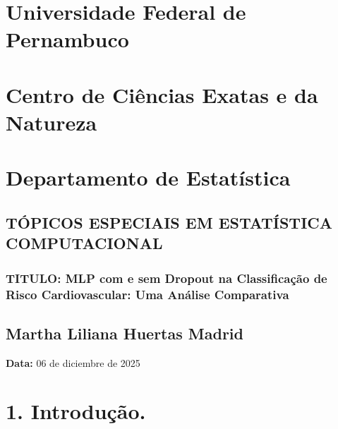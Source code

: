 \documentclass[
  oneclumn]{article}
\author{}
\date{}
\begin{document}
\section{Universidade Federal de
Pernambuco}\label{universidade-federal-de-pernambuco}

\vspace{-.4cm}

\section{Centro de Ciências Exatas e da
Natureza}\label{centro-de-ciuxeancias-exatas-e-da-natureza}

\vspace{-.4cm}

\section{Departamento de
Estatística}\label{departamento-de-estatuxedstica}

\vspace{.5cm}

\subsection{TÓPICOS ESPECIAIS EM ESTATÍSTICA
COMPUTACIONAL}\label{tuxf3picos-especiais-em-estatuxedstica-computacional}

\vspace{.2cm}

\subsubsection{TITULO: MLP com e sem Dropout na Classificação de Risco
Cardiovascular: Uma Análise
Comparativa}\label{titulo-mlp-com-e-sem-dropout-na-classificauxe7uxe3o-de-risco-cardiovascular-uma-anuxe1lise-comparativa}

\vspace{.5cm}

\subsection{Martha Liliana Huertas
Madrid}\label{martha-liliana-huertas-madrid}

\vspace{.5cm}

\textbf{Data:} 06 de diciembre de 2025 \vspace{.5cm}

\section{1. Introdução.}\label{introduuxe7uxe3o.}
\end{document}
